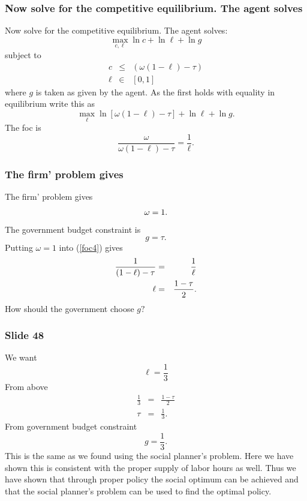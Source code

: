 \documentclass[aspectratio=169]{ltx-talk}
\begin{document}
\begin{frame}
\frametitle{Now solve for the competitive equilibrium. The agent solves}
Now solve for the competitive equilibrium. The agent solves:%
\begin{equation*}
\underset{c,\ell }{\max }\ln c+\ln \ell +\ln g
\end{equation*}%
subject to%
\begin{eqnarray*}
c &\leq &\left( \omega \left( 1-\ell \right) -\tau \right) \\
\ell &\in &\left[ 0,1\right]
\end{eqnarray*}%
where $g$ is taken as given by the agent. As the first holds with equality
in equilibrium write this as 
\begin{equation*}
\underset{\ell }{\max }\ln \left[ \omega \left( 1-\ell \right) -\tau \right]
+\ln \ell +\ln g.
\end{equation*}%
The foc is 
\begin{equation}
\frac{\omega }{\omega \left( 1-\ell \right) -\tau }=\frac{1}{\ell }.
\label{foc4}
\end{equation}%
\end{frame}

\begin{frame}
\frametitle{The firm{'} problem gives}
The firm' problem gives 
\begin{equation}
\omega =1.  \notag
\end{equation}%
The government budget constraint is%
\begin{equation}
g=\tau .  \label{bc}
\end{equation}%
Putting $\omega =1$ into (\ref{foc4}) gives 
\begin{eqnarray}
\frac{1}{\left( 1-\ell \right) -\tau } &=&\frac{1}{\ell }  \label{foc5} \\
\ell &=&\frac{1-\tau }{2}.  \notag
\end{eqnarray}%
$\allowbreak $How should the government choose $g?$
\end{frame}

\begin{frame}
\frametitle{Slide 48}
We want 
\begin{equation*}
\ell =\frac{1}{3}
\end{equation*}%
From above%
\begin{eqnarray*}
\frac{1}{3} &=&\frac{1-\tau }{2} \\
\tau &=&\frac{1}{3}.
\end{eqnarray*}%
From government budget constraint%
\begin{equation*}
g=\frac{1}{3}.
\end{equation*}%
This is the same as we found using the social planner's problem. Here we
have shown this is consistent with the proper supply of labor hours as well.
Thus we have shown that through proper policy the social optimum can be
achieved and that the social planner's problem can be used to find the
optimal policy.
\end{frame}
\end{document}
